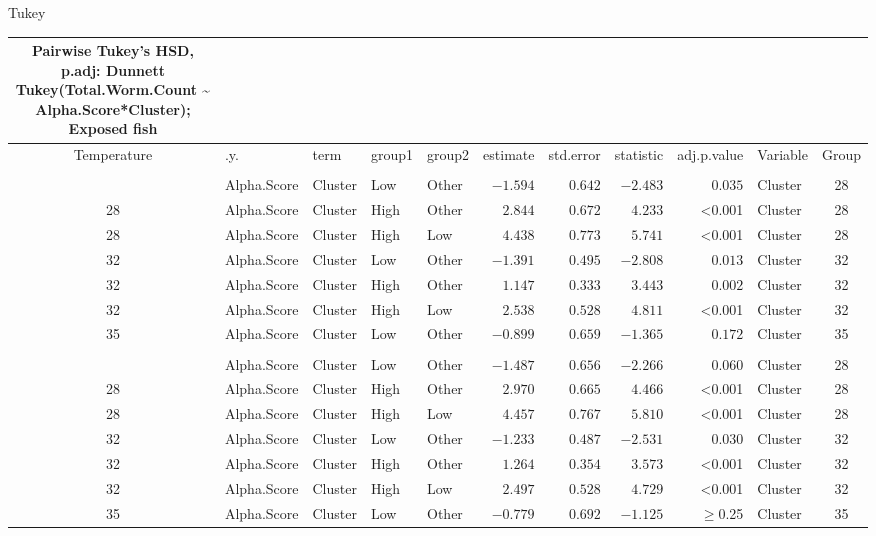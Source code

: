 \documentclass[
]{article}
\begin{document}
Tukey

\begin{longtable}{cllllrrrrlc}
\caption*{
{\large Pairwise Tukey's HSD, p.adj: Dunnett} \\ 
{\small Tukey(Total.Worm.Count \textasciitilde{} Alpha.Score*Cluster); Exposed fish}
} \\ 
\toprule
Temperature & .y. & term & group1 & group2 & estimate & std.error & statistic & adj.p.value & Variable & Group \\ 
\midrule\addlinespace[2.5pt]
\multicolumn{11}{l}{Shannon} \\ 
\midrule\addlinespace[2.5pt]
28 & Alpha.Score & Cluster & Low & Other & $-1.594$ & $0.642$ & $-2.483$ & $0.035$ & Cluster & 28 \\ 
28 & Alpha.Score & Cluster & High & Other & $2.844$ & $0.672$ & $4.233$ & <0.001 & Cluster & 28 \\ 
28 & Alpha.Score & Cluster & High & Low & $4.438$ & $0.773$ & $5.741$ & <0.001 & Cluster & 28 \\ 
32 & Alpha.Score & Cluster & Low & Other & $-1.391$ & $0.495$ & $-2.808$ & $0.013$ & Cluster & 32 \\ 
32 & Alpha.Score & Cluster & High & Other & $1.147$ & $0.333$ & $3.443$ & $0.002$ & Cluster & 32 \\ 
32 & Alpha.Score & Cluster & High & Low & $2.538$ & $0.528$ & $4.811$ & <0.001 & Cluster & 32 \\ 
35 & Alpha.Score & Cluster & Low & Other & $-0.899$ & $0.659$ & $-1.365$ & $0.172$ & Cluster & 35 \\ 
\midrule\addlinespace[2.5pt]
\multicolumn{11}{l}{Simpson} \\ 
\midrule\addlinespace[2.5pt]
28 & Alpha.Score & Cluster & Low & Other & $-1.487$ & $0.656$ & $-2.266$ & $0.060$ & Cluster & 28 \\ 
28 & Alpha.Score & Cluster & High & Other & $2.970$ & $0.665$ & $4.466$ & <0.001 & Cluster & 28 \\ 
28 & Alpha.Score & Cluster & High & Low & $4.457$ & $0.767$ & $5.810$ & <0.001 & Cluster & 28 \\ 
32 & Alpha.Score & Cluster & Low & Other & $-1.233$ & $0.487$ & $-2.531$ & $0.030$ & Cluster & 32 \\ 
32 & Alpha.Score & Cluster & High & Other & $1.264$ & $0.354$ & $3.573$ & <0.001 & Cluster & 32 \\ 
32 & Alpha.Score & Cluster & High & Low & $2.497$ & $0.528$ & $4.729$ & <0.001 & Cluster & 32 \\ 
35 & Alpha.Score & Cluster & Low & Other & $-0.779$ & $0.692$ & $-1.125$ & $\geq$0.25 & Cluster & 35 \\ 

\end{longtable}
\end{document}
